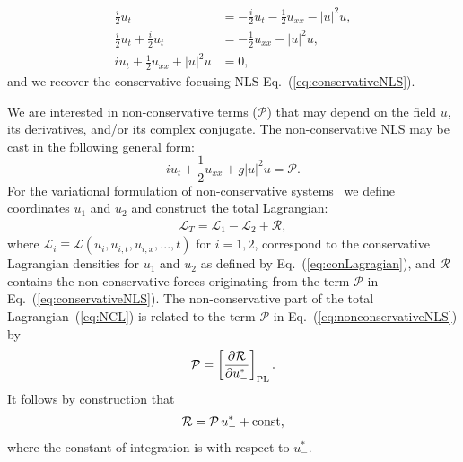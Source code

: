 \begin{align}
\frac{i}{2} u_t &=  -\frac{i}{2} u_t - \frac{1}{2} u_{xx} - |u|^2 u, \\
\frac{i}{2} u_t + \frac{i}{2} u_t &= - \frac{1}{2} u_{xx} - |u|^2 u,  \\
i u_t + \frac{1}{2} u_{xx} + |u|^2 u &= 0 \label{eq:ooNLS},
\end{align}
and we recover the conservative focusing NLS Eq.~(\ref{eq:conservativeNLS}).  

We are interested in non-conservative terms ($\mathcal{P}$) that may depend on the field $u$, its derivatives, and/or its complex conjugate.  The non-conservative NLS may be cast in the following general form:
 \begin{equation}
i u_t + \frac{1}{2} u_{xx} + g |u|^2 u  =  \mathcal{P}.
\label{eq:nonconservativeNLS}
\end{equation}
For the variational formulation of non-conservative systems~\cite{Galley} we define coordinates $u_1$ and $u_2$ and construct the total Lagrangian:
\begin{align}
\mathcal{L}_T = \mathcal{L}_1- \mathcal{L}_2 + \mathcal{R},
\label{eq:NCL}
\end{align}
where $\mathcal{L}_i \equiv \mathcal{L} (u_i,u_{i,t},u_{i,x},...,t)$ for $i=1,2$, correspond to the conservative Lagrangian densities for $u_1$ and $u_2$ as defined by Eq.~(\ref{eq:conLagragian}), and $\mathcal{R}$ contains the non-conservative forces originating from the term $\mathcal{P}$ in Eq.~(\ref{eq:conservativeNLS}).  The non-conservative part of the total Lagrangian~(\ref{eq:NCL}) is related to the term $\mathcal{P}$ in Eq.~(\ref{eq:nonconservativeNLS}) by
\begin{align}
\mathcal{P}= \left[ \frac{\partial \mathcal{R}}{\partial u_-^*} \right]_{\rm PL}.
\end{align}
It follows by construction that 
\begin{align}
\mathcal{R} = \mathcal{P}\, u_-^* + {\rm const},
\end{align}
where the constant of integration is with respect to $u_-^*$.

